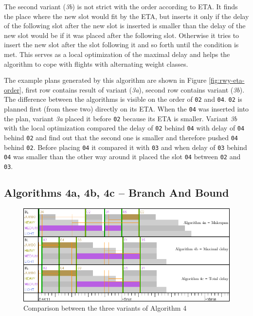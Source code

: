 The second variant ({\em 3b}) is not strict with the order according to ETA. It finds the place where the new slot would fit by the ETA, but inserts it only if the delay of the following slot after the new slot is inserted is smaller than the delay of the new slot would be if it was placed after the following slot. Otherwise it tries to insert the new slot after the slot following it and so forth until the condition is met. This serves as a local optimization of the maximal delay and helps the algorithm to cope with flights with alternating weight classes.

The example plans generated by this algorithm are shown in Figure \ref{fig:rwy-eta-order}, first row contains result of variant ({\em 3a}), second row contains variant ({\em 3b}). The difference between the algorithms is visible on the order of \texttt{02} and \texttt{04}. \texttt{02} is planned first (from these two) directly on its ETA. When the \texttt{04} was inserted into the plan, variant {\em 3a} placed it before \texttt{02} because its ETA is smaller. Variant {\em 3b} with the local optimization compared the delay of \texttt{02} behind \texttt{04} with delay of \texttt{04} behind \texttt{02} and find out that the second one is smaller and therefore pushed \texttt{04} behind \texttt{02}. Before placing \texttt{04} it compared it with \texttt{03} and when delay of \texttt{03} behind \texttt{04} was smaller than the other way around it placed the slot \texttt{04} between \texttt{02} and \texttt{03}.

\subsection{Algorithms 4a, 4b, 4c – Branch And Bound}

\begin{figure}[h]
    \centering
    \includegraphics[width=\textwidth]{figures/rwy-bab.png}
    \caption{Comparison between the three variants of Algorithm 4}
    \label{fig:rwy-bab}
\end{figure}

